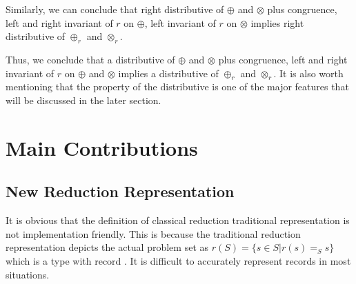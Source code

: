 \documentclass[a4paper,12pt,twoside,openright]{report}
\begin{document}
Similarly, we can conclude that right distributive of $\oplus$ and $\otimes$ plus congruence, left and right invariant of $r$ on $\oplus$, left invariant of $r$ on $\otimes$ implies right distributive of $\oplus_r$ and $\otimes_r$.

Thus, we conclude that a distributive of $\oplus$ and $\otimes$ plus congruence, left and right invariant of $r$ on $\oplus$ and $\otimes$ implies a distributive of $\oplus_r$ and $\otimes_r$.
It is also worth mentioning that the property of the distributive is one of the major features that will be discussed in the later section.

%
%
%

\chapter{Main Contributions} 


\section{New Reduction Representation}
It is obvious that the definition of classical reduction traditional representation is not implementation friendly.
This is because the traditional reduction representation depicts the actual problem set as $r(S) = \{s\in S|r(s)=_S s\}$ which is a type with record . It is difficult to accurately represent records in most situations. 
\end{document}
